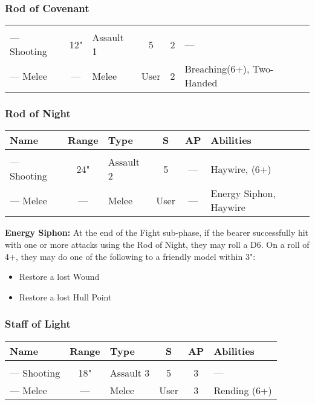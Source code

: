\subsubsection{Rod of Covenant} \label{Rod of Covenant}

\noindent
\begin{NiceTabular}{L{115 pt} c C{40pt} *{2}{c} >{\raggedright\arraybackslash}p{240pt}}
	 &  &  &  &  & \\
	— Shooting & 12" & Assault 1 & 5 & 2 & — \\
	— Melee & — & Melee & User & 2 & Breaching(6+), Two-Handed \\
\end{NiceTabular}

\subsubsection{Rod of Night} \label{Rod of Night}
\noindent
\begin{NiceTabular}{L{115 pt} c C{40pt} *{2}{c} >{\raggedright\arraybackslash}p{240pt}}
	Name & Range & Type & S & AP & Abilities \\
	\hline
	 &  &  &  &  & \\
	— Shooting & 24" & Assault 2 & 5 & — & Haywire,  (6+) \\
	— Melee & — & Melee & User & — & Energy Siphon, Haywire \\
\end{NiceTabular}

\vspace*{1em}
\label{Energy Siphon}
\textbf{Energy Siphon:} At the end of the Fight sub-phase, if the bearer successfully hit with one or more attacks using the Rod of Night, they may roll a D6. On a roll of 4+, they may do one of the following to a friendly model within 3":
\begin{itemize}
	\item Restore a lost Wound
	\item Restore a lost Hull Point
\end{itemize}


\subsubsection{Staff of Light} \label{Staff of Light}
\noindent
\begin{NiceTabular}{L{115 pt} c C{40pt} *{2}{c} >{\raggedright\arraybackslash}p{240pt}}
	Name & Range & Type & S & AP & Abilities \\
	\hline
	 & & &  &  &  \\
	— Shooting & 18" & Assault 3 & 5 & 3 & — \\
	— Melee & — & Melee & User & 3 & Rending (6+) \\
\end{NiceTabular}

